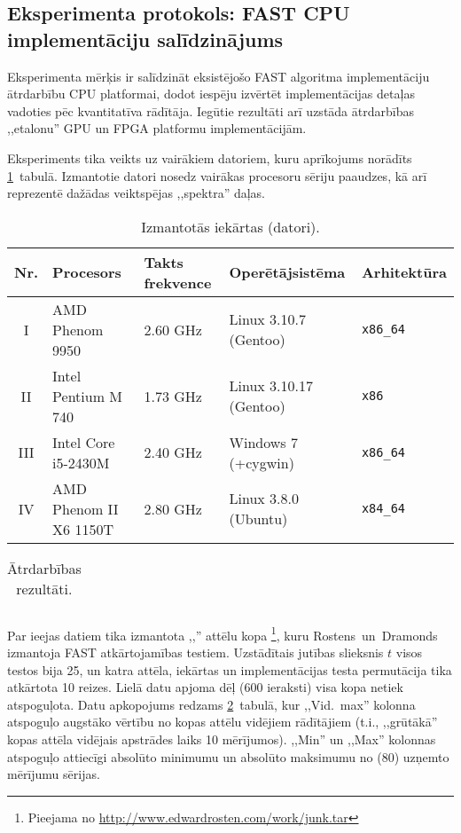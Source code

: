\subsection{Eksperimenta protokols: FAST CPU implementāciju salīdzinājums}\label{appx:test1}
\setcounter{table}{0} %
\setcounter{figure}{0} %
Eksperimenta mērķis ir salīdzināt
eksistējošo FAST algoritma implementāciju ātrdarbību CPU platformai, 
dodot iespēju izvērtēt implementācijas detaļas vadoties 
pēc kvantitatīva rādītāja. Iegūtie rezultāti arī uzstāda ātrdarbības 
,,etalonu'' GPU un FPGA platformu implementācijām.

Eksperiments tika veikts uz vairākiem datoriem, kuru aprīkojums norādīts
\ref{tbl:test1-dev}~tabulā. Izmantotie datori nosedz vairākas procesoru
sēriju paaudzes, kā arī reprezentē dažādas veiktspējas ,,spektra'' daļas.
\begin{table}[hb]\footnotesize
	\centering
	\caption{Izmantotās iekārtas (datori).}
	\label{tbl:test1-dev}
	\vspace{4pt}
	\begin{tabular}{cllll}
		\toprule
		\textbf{Nr.} & \textbf{Procesors} & \textbf{Takts frekvence} & 
			\textbf{Operētājsistēma} & \textbf{Arhitektūra}\\
		\midrule
		I & AMD Phenom 9950 & 2.60 GHz & Linux 3.10.7 (Gentoo) & \texttt{x86\_64}\\
		II & Intel Pentium M 740 & 1.73 GHz & Linux 3.10.17 (Gentoo) & \texttt{x86}\\
		III & Intel Core i5-2430M & 2.40 GHz & Windows 7 (+cygwin) & \texttt{x86\_64}\\
		IV & AMD Phenom II X6 1150T & 2.80 GHz & Linux 3.8.0 (Ubuntu) & \texttt{x84\_64}\\
		\bottomrule
	\end{tabular}
\end{table}

\begin{table}[hb]\footnotesize
	\centering
	\caption{Ātrdarbības rezultāti.}
	\label{tbl:test1-data}
	\vspace{4pt}
	\begin{tabular}{clcccrr}
		\toprule
		
		\bottomrule
	\end{tabular}
\end{table}

Par ieejas datiem tika izmantota ,,'' attēlu kopa%
	\footnote{Pieejama no \url{http://www.edwardrosten.com/work/junk.tar}},
kuru Rostens~un~Dramonds\cite{FAST} izmantoja FAST atkārtojamības testiem.
Uzstādītais jutības slieksnis $t$ visos testos bija 25, un katra 
attēla, iekārtas un implementācijas testa permutācija tika atkārtota 10 reizes.
Lielā datu apjoma dēļ (600 ieraksti) visa kopa netiek atspoguļota. Datu
apkopojums redzams \ref{tbl:test1-data}~tabulā, kur ,,Vid.~max'' kolonna
atspoguļo augstāko vērtību no kopas attēlu vidējiem rādītājiem
(t.i., ,,grūtākā'' kopas attēla vidējais apstrādes laiks 10 mērījumos).
,,Min'' un ,,Max'' kolonnas atspoguļo attiecīgi absolūto minimumu un absolūto
maksimumu no (80) uzņemto mērījumu sērijas.

